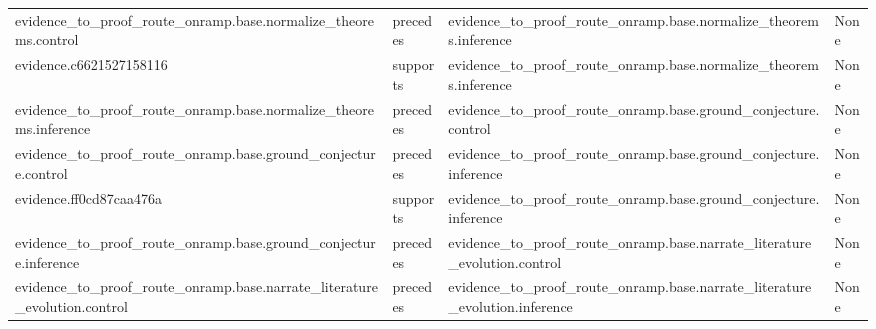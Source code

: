 \documentclass[10pt,a4paper]{article}
\begin{document}
\begin{longtable}{@{}>{\raggedright\arraybackslash}p{.24\linewidth}>{\raggedright\arraybackslash}p{.12\linewidth}>{\raggedright\arraybackslash}p{.24\linewidth}>{\raggedright\arraybackslash}p{.20\linewidth}@{}}
evidence\_\allowbreak{}to\_\allowbreak{}proof\_\allowbreak{}route\_\allowbreak{}onramp.\allowbreak{}base.\allowbreak{}normalize\_\allowbreak{}theorems.\allowbreak{}control & precedes & evidence\_\allowbreak{}to\_\allowbreak{}proof\_\allowbreak{}route\_\allowbreak{}onramp.\allowbreak{}base.\allowbreak{}normalize\_\allowbreak{}theorems.\allowbreak{}inference & None\\
evidence.\allowbreak{}c662152715\allowbreak{}8116 & supports & evidence\_\allowbreak{}to\_\allowbreak{}proof\_\allowbreak{}route\_\allowbreak{}onramp.\allowbreak{}base.\allowbreak{}normalize\_\allowbreak{}theorems.\allowbreak{}inference & None\\
evidence\_\allowbreak{}to\_\allowbreak{}proof\_\allowbreak{}route\_\allowbreak{}onramp.\allowbreak{}base.\allowbreak{}normalize\_\allowbreak{}theorems.\allowbreak{}inference & precedes & evidence\_\allowbreak{}to\_\allowbreak{}proof\_\allowbreak{}route\_\allowbreak{}onramp.\allowbreak{}base.\allowbreak{}ground\_\allowbreak{}conjecture\allowbreak{}.\allowbreak{}control & None\\
evidence\_\allowbreak{}to\_\allowbreak{}proof\_\allowbreak{}route\_\allowbreak{}onramp.\allowbreak{}base.\allowbreak{}ground\_\allowbreak{}conjecture\allowbreak{}.\allowbreak{}control & precedes & evidence\_\allowbreak{}to\_\allowbreak{}proof\_\allowbreak{}route\_\allowbreak{}onramp.\allowbreak{}base.\allowbreak{}ground\_\allowbreak{}conjecture\allowbreak{}.\allowbreak{}inference & None\\
evidence.\allowbreak{}ff0cd87caa\allowbreak{}476a & supports & evidence\_\allowbreak{}to\_\allowbreak{}proof\_\allowbreak{}route\_\allowbreak{}onramp.\allowbreak{}base.\allowbreak{}ground\_\allowbreak{}conjecture\allowbreak{}.\allowbreak{}inference & None\\
evidence\_\allowbreak{}to\_\allowbreak{}proof\_\allowbreak{}route\_\allowbreak{}onramp.\allowbreak{}base.\allowbreak{}ground\_\allowbreak{}conjecture\allowbreak{}.\allowbreak{}inference & precedes & evidence\_\allowbreak{}to\_\allowbreak{}proof\_\allowbreak{}route\_\allowbreak{}onramp.\allowbreak{}base.\allowbreak{}narrate\_\allowbreak{}literature\allowbreak{}\_\allowbreak{}evolution.\allowbreak{}control & None\\
evidence\_\allowbreak{}to\_\allowbreak{}proof\_\allowbreak{}route\_\allowbreak{}onramp.\allowbreak{}base.\allowbreak{}narrate\_\allowbreak{}literature\allowbreak{}\_\allowbreak{}evolution.\allowbreak{}control & precedes & evidence\_\allowbreak{}to\_\allowbreak{}proof\_\allowbreak{}route\_\allowbreak{}onramp.\allowbreak{}base.\allowbreak{}narrate\_\allowbreak{}literature\allowbreak{}\_\allowbreak{}evolution.\allowbreak{}inference & None\\

\end{longtable}
\end{document}
